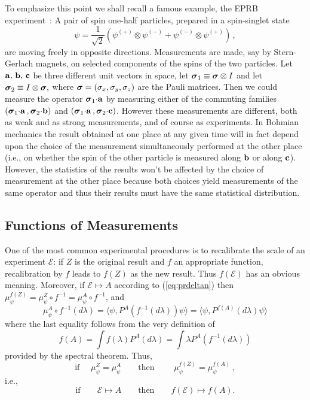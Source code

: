 \documentclass[12pt]{article}
\newcommand{\BM}{Bohmian mechanics}
\newcommand{\mybold}[1]{\mbox{\boldmath $#1$}}
\newcommand{\id}{I}
\newcommand{\lam}{\lambda}
\newcommand{\ot}{\otimes}
\newcommand{\E}{\mbox{$\mathscr{E}$}}
\begin{document}
To emphasize this point we shall recall a famous example, the EPRB
experiment~\cite{EPR, Boh51}: A pair of spin one-half particles,
prepared in a spin-singlet state $$
\psi =
\frac{1}{\sqrt{2}}\left(\psi^{(+)}\otimes\psi^{(-)} +
   \psi^{(-)}\otimes\psi^{(+)}\right)\,,$$
are moving freely in
opposite directions.  Measurements are made, say by Stern-Gerlach
magnets, on selected components of the spins of the two particles.
Let $\bf {a} ,\, {b} ,\, {c}$ be three different unit vectors in
space, let $\mybold{\sigma}_{1} \equiv \mybold{\sigma}\ot \id$ and let
$\mybold{\sigma}_{2} \equiv \id \ot \mybold{\sigma}, $ where $
\mybold{\sigma} =(\sigma_x,\sigma_y,\sigma_z)$ are the Pauli matrices.
Then we could measure the operator $\mybold{\sigma}_{1}{\bf\cdot {a}}$
by measuring either of the commuting families $( \mybold{\sigma}_{1}
{\bf \cdot {a}}\,, \mybold{\sigma}_{2} {\bf \cdot {b}})$ and $(
\mybold{\sigma}_{1} {\bf \cdot {a}} \,, \mybold{\sigma}_{2} {\bf \cdot
   {c}}) $.  However these measurements are different, both as weak and
as strong measurements, and of course as experiments.  In \BM{} the
result obtained at one place at any given time will in fact depend
upon the choice of the measurement simultaneously performed at the
other place (i.e., on whether the spin of the other particle is
measured along $\bf {b}$ or along $\bf{c}$).  However, the statistics
of the results won't be affected by the choice of measurement at the
other place because both choices yield measurements of the same
operator and thus their results must have the same statistical
distribution.


\subsection{Functions of Measurements}

One of the most common experimental procedures is to recalibrate the
scale of an experiment \E{}: if $Z$ is the original result and $f$ an
appropriate function, recalibration by $f$ leads to $f({Z})$ as the
new result. Thus $f(\E)$ has an obvious meaning.  Moreover, if
$\E\mapsto A$ according to (\ref{eq:prdeltan}) then $ \mu^{
   f(Z)}_{\psi} =\mu^{ Z}_{\psi} \circ f^{-1} = \mu^A_\psi \circ f^{-1}
$, and
$$
\mu^A_\psi \circ f^{-1}(d\lam) =
\langle\psi,P^{A}(f^{-1}(d\lambda))\psi\rangle =
\langle\psi,P^{f(A)}(d\lambda)\psi\rangle
$$
where the last equality follows {}from the very definition of
$$f(A) = \int f(\lam) P^{A} (d\lam) = \int \lam
P^{A}(f^{-1}(d\lambda))$$
provided by the spectral theorem.  Thus,
\begin{equation}
\mbox{if }\quad \mu^{ Z}_{\psi} =\mu^A_\psi \qquad
\mbox{then }\qquad  \mu^{ f(Z)}_{\psi} =\mu^{f(A)}_\psi\,,
\label{eq:prfm}
\end{equation}
i.e.,
\begin{equation}
\text{if}\qquad \E \mapsto A \qquad\text{then}\qquad f(\E) \mapsto
f(A).
\end{equation}
\end{document}
